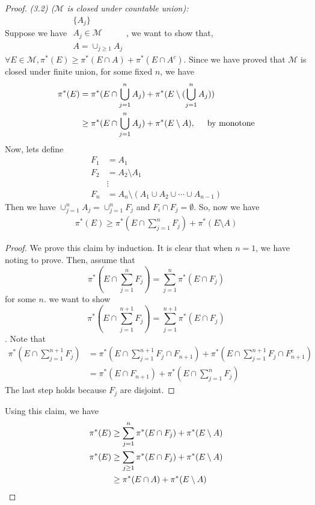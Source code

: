 \begin{proof}
  \emph{(3.2) ($\mathcal{M}$ is closed under countable union):} \\
  Suppose we have $\substack{\{A_j\}\\A_j\in\mathcal{M}\\A=\cup_{j\geq 1} A_j}$,
  we want to show that, $\forall E\in\mathcal{M}, \pi^*(E)\geq \pi^*(E\cap A) + \pi^*(E\cap A^c)$.
  Since we have proved that $\mathcal{M}$ is closed under finite union,
  for some fixed $n$, we have
  \begin{align*}
    \pi^*(E) &= \pi^*(E\cap \bigcup_{j=1}^n A_j) + \pi^*(E\setminus (\bigcup_{j=1}^n A_j)) \\
    &\geq \pi^*(E\cap \bigcup_{j=1}^n A_j) + \pi^*(E\setminus A), \hspace{0.5cm} \mbox{by monotone} 
  \end{align*}
  Now, lets define
  \begin{align*}
    F_1 &= A_1 \\
    F_2 &= A_2\setminus A_1 \\
        &\vdots\\
    F_n &= A_n\setminus(A_1\cup A_2 \cup \cdots \cup A_{n-1})
  \end{align*}
  Then we have $\cup_{j=1}^n A_j = \cup_{j=1}^n F_j$ and $F_i\cap F_j = \emptyset$.
  So, now we have
  \begin{align*}
    \pi^*(E) \geq \pi^*(E\cap \sum_{j=1}^n F_j) + \pi^*(E\setminus A)
  \end{align*}
  \begin{claim}[$\pi^*(E\cap \sum_{j=1}^n F_j) = \sum_{j=1}^n \pi^*(E\cap F_j)$\label{claim:additive}]
    \begin{proof}
      We prove this claim by induction.
      It is clear that when $n = 1$, we have noting to prove.
      Then, assume that \[\pi^*(E\cap \sum_{j=1}^n F_j) = \sum_{j=1}^n \pi^*(E\cap F_j)\] for some $n$.
      we want to show \[\pi^*(E\cap \sum_{j=1}^{n+1} F_j) = \sum_{j=1}^{n+1} \pi^*(E\cap F_j)\].
      Note that
      \begin{align*}
        \pi^*(E\cap \sum_{j=1}^{n+1} F_j) &= \pi^*(E\cap \sum_{j=1}^{n+1} F_j \cap F_{n+1}) + \pi^*(E\cap \sum_{j=1}^{n+1} F_j \cap F_{n+1}^c) \\
        &= \pi^*(E\cap F_{n+1}) + \pi^*(E\cap\sum_{j=1}^n F_j)
      \end{align*}
      The last step holds because $F_j$ are disjoint.
    \end{proof}
  \end{claim}
  Using this claim, we have
  \begin{align*}
    \pi^*(E) &\geq \sum_{j=1}^n \pi^*(E\cap F_j) + \pi^*(E\setminus A) \\
    \pi^*(E) &\geq \sum_{j\geq 1} \pi^*(E\cap F_j) + \pi^*(E\setminus A) \\
    &\geq \pi^*(E\cap A) + \pi^*(E\setminus A) \qedhere
  \end{align*}
\end{proof}

